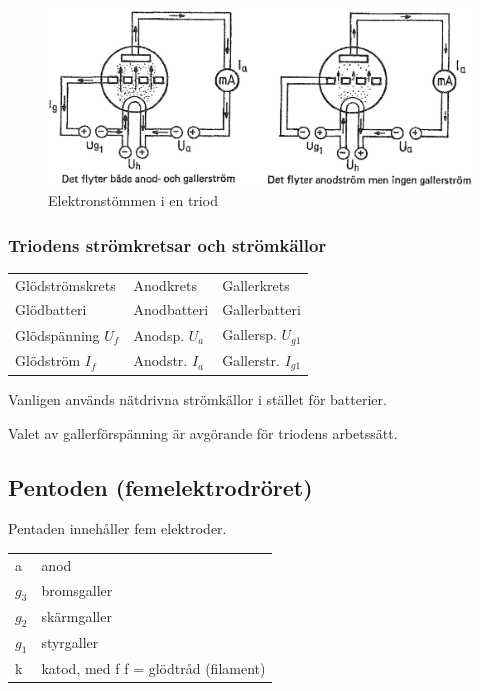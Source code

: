 \begin{figure}[h]
\includegraphics[width=\textwidth]{images/cropped_pdfs/bild_2_2-31.pdf}
\caption{Elektronstömmen i en triod}
\label{fig:BildII2-31}
\end{figure}

\subsubsection{Triodens strömkretsar och strömkällor}

\begin{tabular}{lll}
Glödströmskrets      & Anodkrets        &  Gallerkrets \\
Glödbatteri          & Anodbatteri      &  Gallerbatteri \\
Glödspänning \(U_f\) & Anodsp. \(U_a\)  &  Gallersp. \(U_{g1}\) \\
Glödström \(I_f\)    & Anodstr. \(I_a\) &  Gallerstr. \(I_{g1}\) \\
\end{tabular}

Vanligen används nätdrivna strömkällor i stället för batterier.

Valet av gallerförspänning är avgörande för triodens arbetssätt.

\subsection{Pentoden (femelektrodröret)}

Pentaden innehåller fem elektroder.

\begin{tabular}{ll}
  a       & anod \\
  \(g_3\) & bromsgaller \\
  \(g_2\) & skärmgaller \\
  \(g_1\) & styrgaller \\
  k      & katod, med f f = glödtråd (filament) \\
\end{tabular}

